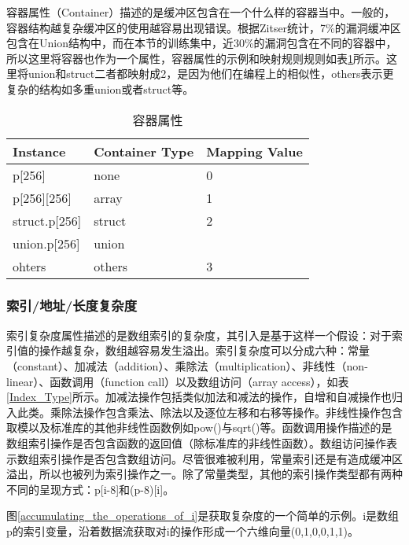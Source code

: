 {容器属性（Container）描述的是缓冲区包含在一个什么样的容器当中。一般的，容器结构越复杂缓冲区的使用越容易出现错误。根据Zitser统计，7\%的漏洞缓冲区包含在Union结构中，而在本节的训练集中，近30\%的漏洞包含在不同的容器中，所以这里将容器也作为一个属性，容器属性的示例和映射规则规则如表\ref{Container_Attributes}所示。这里将union和struct二者都映射成2，是因为他们在编程上的相似性，others表示更复杂的结构如多重union或者struct等。


\begin{table}[ht]
\begin{center}
\caption{容器属性} \label{Container_Attributes}
\begin{small}
\begin{tabular}{lll}
\hline
{\bf Instance } & {\bf Container Type} & {\bf Mapping Value} \\
\hline
p[256] & none &  0\\
\hline
p[256][256] & array & 1 \\ \hline
struct.p[256] & struct & 2  \\ 
union.p[256] & union & \\ \hline
ohters & others & 3 \\ \hline
\end{tabular}
\end{small}
\end{center}
\end{table}

\subsubsection{索引/地址/长度复杂度}

索引复杂度属性描述的是数组索引的复杂度，其引入是基于这样一个假设：对于索引值的操作越复杂，数组越容易发生溢出。索引复杂度可以分成六种：常量（constant）、加减法（addition）、乘除法（multiplication）、非线性（non-linear）、函数调用（function call）以及数组访问（array access），如表\ref{Index_Type}所示。加减法操作包括类似加法和减法的操作，自增和自减操作也归入此类。乘除法操作包含乘法、除法以及逐位左移和右移等操作。非线性操作包含取模以及标准库的其他非线性函数例如pow()与sqrt()等。函数调用操作描述的是数组索引操作是否包含函数的返回值（除标准库的非线性函数）。数组访问操作表示数组索引操作是否包含数组访问。尽管很难被利用，常量索引还是有造成缓冲区溢出，所以也被列为索引操作之一。除了常量类型，其他的索引操作类型都有两种不同的呈现方式：p[i-8]和(p-8)[i]。

图\ref{accumulating_the_operations_of_i}是获取复杂度的一个简单的示例。i是数组p的索引变量，沿着数据流获取对i的操作形成一个六维向量{(0,1,0,0,1,1)}。

}
